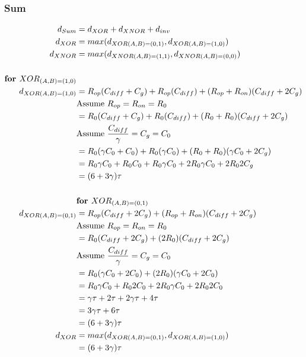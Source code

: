 \documentclass{article}
\begin{document}
\subsubsection*{Sum}
\begin{align*}
d_{Sum} &= d_{XOR} + d_{XNOR} + d_{inv}\\
d_{XOR} &= max(d_{XOR(A,B) = (0, 1)}, d_{XOR(A,B) = (1, 0)})\\
d_{XNOR} &= max(d_{XNOR(A,B) = (1, 1)}, d_{XNOR(A,B) = (0, 0)})\\
\\
\textbf{for $XOR_{(A,B) = (1, 0)}$}\\
d_{XOR(A,B) = (1, 0)} &= R_{op}(C_{diff} + C_{g}) + R_{op}(C_{diff}) + (R_{op} + R_{on})(C_{diff} + 2C_g)\\
&\textnormal{Assume $R_{op} = R_{on} = R_{0}$}\\
&= R_{0}(C_{diff} + C_{g}) + R_{0}(C_{diff}) + (R_{0} + R_{0})(C_{diff} + 2C_g)\\
&\textnormal{Assume $\frac{C_{diff}}{\gamma} = C_{g} = C_{0}$}\\
&= R_{0}(\gamma C_{0} + C_{0}) + R_{0}(\gamma C_{0}) + (R_{0} + R_{0})(\gamma C_{0} + 2C_g)\\
&= R_{0}\gamma C_{0} + R_{0}C_{0} + R_{0}\gamma C_{0} + 2R_{0}\gamma C_{0} + 2R_{0}2C_g\\
&= (6 + 3\gamma)\tau\\
\\
&\textbf{for $XOR_{(A,B) = (0, 1)}$}\\
d_{XOR(A,B) = (0, 1)} &= R_{op}(C_{diff} + 2C_g) + (R_{op} + R_{on})(C_{diff} + 2C_g)\\
&\textnormal{Assume $R_{op} = R_{on} = R_{0}$}\\
&= R_{0}(C_{diff} + 2C_g) + (2R_{0})(C_{diff} + 2C_g)\\
&\textnormal{Assume $\frac{C_{diff}}{\gamma} = C_{g} = C_{0}$}\\
&= R_{0}(\gamma C_0 + 2C_0) + (2R_{0})(\gamma C_0 + 2C_0)\\
&= R_{0} \gamma C_0 + R_{0} 2 C_0 + 2R_{0}\gamma C_0 + 2 R_{0} 2C_0\\
&= \gamma \tau + 2\tau + 2\gamma\tau + 4\tau \\
&= 3\gamma\tau + 6\tau\\
&= (6 + 3\gamma)\tau\\
d_{XOR} &= max(d_{XOR(A,B) = (0, 1)}, d_{XOR(A,B) = (1, 0)})\\
&= (6 + 3\gamma)\tau\\
\\

\end{align*}
\end{document}
